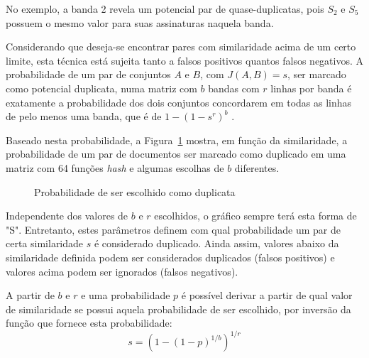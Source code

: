 No exemplo, a banda 2 revela um potencial par de quase-duplicatas, pois $S_2$ e $S_5$ possuem o mesmo valor para suas assinaturas naquela banda.

Considerando que deseja-se encontrar pares com similaridade acima de um certo limite, esta técnica está sujeita tanto a falsos positivos quantos falsos negativos. A probabilidade de um par de conjuntos $A$ e $B$, com $J(A, B) = s$, ser marcado como potencial duplicata, numa matriz com $b$ bandas com $r$ linhas por banda é exatamente a probabilidade dos dois conjuntos concordarem em todas as linhas de pelo menos uma banda, que é de $1 - (1 - s^r)^b$  \cite{rajaraman2012mining}.

Baseado nesta probabilidade, a Figura~\ref{fig:min:lshprob} mostra, em função da similaridade, a probabilidade de um par de documentos ser marcado como duplicado em uma matriz com 64 funções \emph{hash} e algumas escolhas de $b$ diferentes.

\begin{figure}[!htbp]
\centering
{}
\caption{Probabilidade de ser escolhido como duplicata}
\label{fig:min:lshprob}
\end{figure}

Independente dos valores de $b$ e $r$ escolhidos, o gráfico sempre terá esta forma de "S". Entretanto, estes parâmetros definem com qual probabilidade um par de certa similaridade $s$ é considerado duplicado. Ainda assim, valores abaixo da similaridade definida podem ser considerados duplicados (falsos positivos) e valores acima podem ser ignorados (falsos negativos). 

A partir de $b$ e $r$ e uma probabilidade $p$ é possível derivar a partir de qual valor de similaridade se possui aquela probabilidade de ser escolhido, por inversão da função que fornece esta probabilidade:
\[
s = \left(1 - (1-p)^{1/b}\right)^{1/r}
\]

